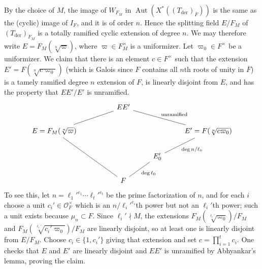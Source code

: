 \documentclass[reqno]{amsart}
\numberwithin{equation}{subsection}
\newcommand{\ol}[1]{\overline{#1}}
\newcommand\cO{\mathcal{O}}
\DeclareMathOperator{\Aut}{Aut}
\DeclareMathOperator{\der}{der}
\theoremstyle{remark}
\numberwithin{equation}{subsection}
\numberwithin{figure}{subsection}
\begin{document}
By the choice of $M$, the image of $W_{F_M}$ in $\Aut(X^*((T_{\der})_{\ol F}))$ is the same as the (cyclic) image of $I_F$, and it is of order $n$. Hence the splitting field $E/F_M$ of $(T_{\der})_{F_M}$ is a totally ramified cyclic extension of degree $n$. We may therefore write $E = F_M(\sqrt[n]{\varpi})$, where $\varpi \in F_M^\times$ is a uniformizer. Let $\varpi_0 \in F^\times$ be a uniformizer. We claim that there is an element $c \in F^\times$ such that the extension $E' = F(\sqrt[n]{c\varpi_0})$ (which is Galois since $F$ contains all $n$th roots of unity in $\ol F$) is a tamely ramified degree $n$ extension of $F$, is linearly disjoint from $E$, and has the property that $EE'/E'$ is unramified.
\[
\begin{tikzcd}
& & EE' \ar[dll, dash] \ar[drr, "\text{unramified}", dash] \\
E  = F_M(\sqrt[n]{\varpi}) \ar[ddrr, dash] & & & & E' = F(\sqrt[n]{c\varpi_0}) \ar[dl, dash, "\deg n/\ell_0"] \\
& & & E_0' \ar[dl, dash, "\deg \ell_0"] \\
& & F
\end{tikzcd}
\]
To see this, let $n = \ell_1'^{e_1} \cdots \ell_t'^{e_t}$ be the prime factorization of $n$, and for each $i$ choose a unit $c_i'\in\cO_F^\times$ which is an $n/\ell_i'^{e_i}$th power but not an $\ell_i'$th power; such a unit exists because $\mu_n\subset F$. Since $\ell_i' \nmid M$, the extensions $F_M(\sqrt[\ell_i']{\varpi_0})/F_M$ and $F_M(\sqrt[\ell_i']{c_i'\varpi_0})/F_M$ are linearly disjoint, so at least one is linearly disjoint from $E/F_M$. Choose $c_i \in \{1, c_i'\}$ giving that extension and set $c = \prod_{i=1}^t c_i$. One checks that $E$ and $E'$ are linearly disjoint and $EE'$ is unramified by Abhyankar's lemma, proving the claim.
\end{document}
